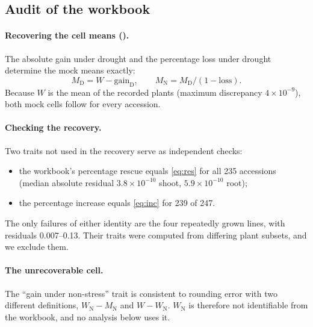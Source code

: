\documentclass[10pt,twocolumn,a4paper]{article}
\theoremstyle{definition}
\theoremstyle{remark}
\newcommand{\MD}{{M_{\mathrm D}}}
\newcommand{\MN}{{M_{\mathrm N}}}
\newcommand{\WD}{W}
\newcommand{\WN}{{W_{\mathrm N}}}
\begin{document}
\subsection{Audit of the workbook}
\label{sec:audit}

\paragraph{Recovering the cell means ().} The absolute
gain under drought and the percentage loss under drought determine the
mock means exactly:
\[
  \MD=\WD-\text{gain}_{\mathrm D},\qquad \MN=\MD/(1-\text{loss}).
\]
Because $\WD$ is the mean of the recorded plants (maximum discrepancy
$4\times10^{-9}$), both mock cells follow for every accession.

\paragraph{Checking the recovery.} Two traits not used in the recovery
serve as independent checks:
\begin{itemize}[leftmargin=1.3em,itemsep=1pt]
  \item the workbook's percentage rescue equals \eqref{eq:res} for all
  235 accessions (median absolute residual $3.8\times10^{-10}$ shoot,
  $5.9\times10^{-10}$ root);
  \item the percentage increase equals \eqref{eq:inc} for 239 of 247.
\end{itemize}
The only failures of either identity are the four repeatedly grown lines,
with residuals 0.007--0.13. Their traits were computed from differing
plant subsets, and we exclude them.

\paragraph{The unrecoverable cell.} The ``gain under non-stress'' trait
is consistent to rounding error with two different definitions,
$\WN-\MN$ and $\WD-\WN$. $\WN$ is therefore not identifiable from the
workbook, and no analysis below uses it.
\end{document}
